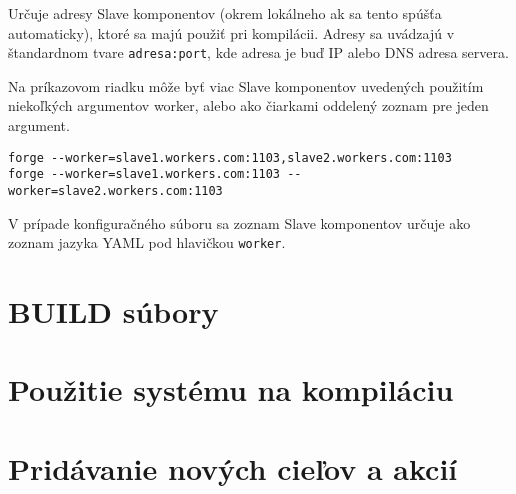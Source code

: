 Určuje adresy Slave komponentov (okrem lokálneho ak sa tento spúšťa automaticky), ktoré
sa majú použiť pri kompilácii. Adresy sa uvádzajú v štandardnom tvare \texttt{adresa:port}, kde
adresa je buď IP alebo DNS adresa servera.

Na príkazovom riadku môže byť viac Slave komponentov uvedených použitím niekoľkých argumentov
worker, alebo ako čiarkami oddelený zoznam pre jeden argument.

\begin{verbatim}
forge --worker=slave1.workers.com:1103,slave2.workers.com:1103
forge --worker=slave1.workers.com:1103 --worker=slave2.workers.com:1103
\end{verbatim}

V prípade konfiguračného súboru sa zoznam Slave komponentov určuje ako
zoznam jazyka YAML pod hlavičkou \texttt{worker}.

\section{BUILD s\'{u}bory}
\label{sec:buildfiles}

\section{Pou\v{z}itie syst\'{e}mu na kompil\'{a}ciu}
\label{sec:usage}

\section{Prid\'{a}vanie nov\'{y}ch cie\v{l}ov a akci\'{i}}
\label{sec:contributing}
